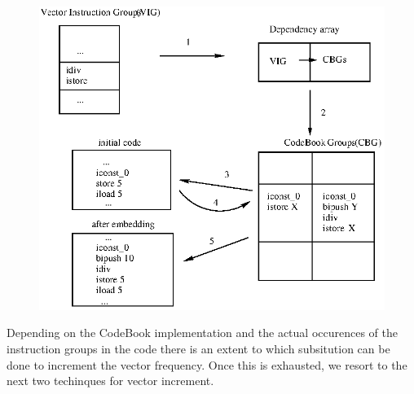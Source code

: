 \begin{itemize}
         \begin{figure}
         \begin{center}
         \includegraphics{fig1.eps}
         \end{center}
	 \caption{}
	 \label{}
         \end{figure}

         Depending on the CodeBook implementation and the actual occurences of
	 the instruction groups in the code there is an extent to which
	 subsitution can be done to increment the vector frequency. Once this
	 is exhausted, we resort to the next two techinques for vector increment.


\end{itemize}
